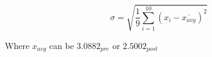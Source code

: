 \documentclass{article}
\begin{document}
   $$\sigma = \sqrt{\dfrac{1}{9} \sum_{i=1}^{10} (x_i - \overline{x_{avg}})^2}$$
   \begin{center}
       Where $x_{avg}$ can be $3.0882_{pre}$ or $2.5002_{post}$
   \end{center}
\end{document}
